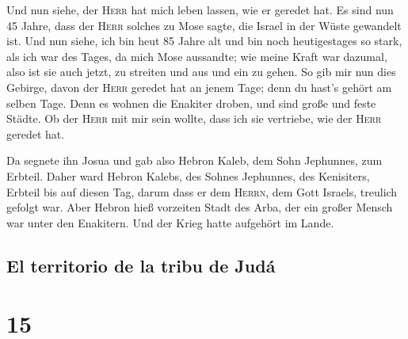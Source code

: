  Und nun siehe, der \textsc{Herr} hat mich leben lassen,
wie er geredet hat. Es sind nun 45 Jahre, dass der \textsc{Herr} solches
zu Mose sagte, die Israel in der Wüste gewandelt ist. Und nun siehe, ich
bin heut 85 Jahre alt  und bin noch heutigestages so
stark, als ich war des Tages, da mich Mose aussandte; wie meine Kraft
war dazumal, also ist sie auch jetzt, zu streiten und aus und ein zu
gehen.  So gib mir nun dies Gebirge, davon der
\textsc{Herr} geredet hat an jenem Tage; denn du hast's gehört am selben
Tage. Denn es wohnen die Enakiter droben, und sind große und feste
Städte. Ob der \textsc{Herr} mit mir sein wollte, dass ich sie
vertriebe, wie der \textsc{Herr} geredet hat.

 Da segnete ihn Josua und gab also Hebron Kaleb, dem Sohn
Jephunnes, zum Erbteil.  Daher ward Hebron Kalebs, des
Sohnes Jephunnes, des Kenisiters, Erbteil bis auf diesen Tag, darum dass
er dem \textsc{Herrn}, dem Gott Israels, treulich gefolgt war.
 Aber Hebron hieß vorzeiten Stadt des Arba, der ein
großer Mensch war unter den Enakitern. Und der Krieg hatte aufgehört im
Lande.

\hypertarget{el-territorio-de-la-tribu-de-juduxe1}{%
\subsection{El territorio de la tribu de
Judá}\label{el-territorio-de-la-tribu-de-juduxe1}}

\hypertarget{section-14}{%
\section{15}\label{section-14}}

